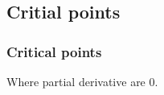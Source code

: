 
\subsection{Critial points}

\subsubsection{Critical points}

Where partial derivative are \(0\).

